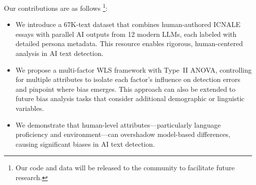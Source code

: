 Our contributions are as follows \footnote{Our code and data will be released to the community to facilitate future research.}: 
\begin{itemize}
\item We introduce a 67K-text dataset that combines human-authored ICNALE essays with parallel AI outputs from 12 modern LLMs, each labeled with detailed persona metadata. This resource enables rigorous, human-centered analysis in AI text detection. 
\item We propose a multi-factor WLS framework with Type~II ANOVA, controlling for multiple attributes to isolate each factor’s influence on detection errors and pinpoint where bias emerges. This approach can also be extended to future bias analysis tasks that consider additional demographic or linguistic variables.
\item We demonstrate that human-level attributes—particularly language proficiency and environment—can overshadow model-based differences, causing significant biases in AI text detection. 
\end{itemize}

